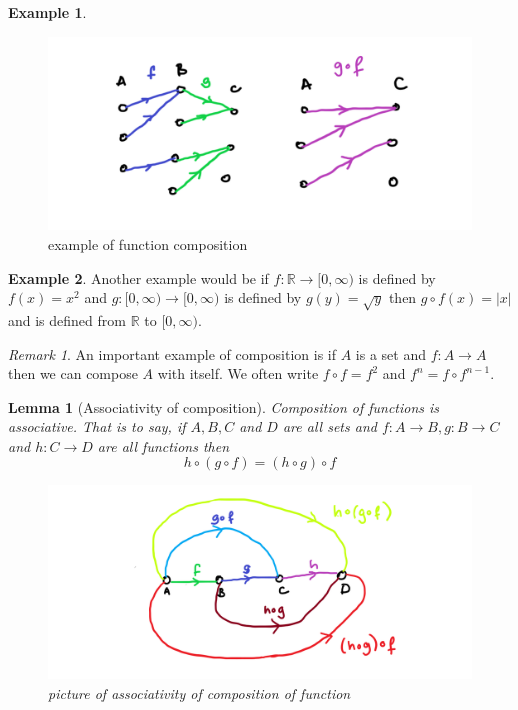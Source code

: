 \documentclass[
]{book}
\newtheorem{lemma}{Lemma}[chapter]
\theoremstyle{definition}
\theoremstyle{definition}
\newtheorem{example}{Example}[chapter]
\theoremstyle{definition}
\theoremstyle{definition}
\theoremstyle{remark}
\newtheorem*{remark}{Remark}
\begin{document}
\begin{example}

\begin{figure}
\centering
\includegraphics{compositionexample.png}
\caption{\label{fig:unnamed-chunk-18}example of function composition}
\end{figure}

\end{example}

\begin{example}
Another example would be if \(f: \mathbb{R} \rightarrow [0,\infty)\) is defined by \(f(x) = x^2\) and \(g: [0,\infty) \rightarrow [0, \infty)\) is defined by \(g(y) = \sqrt{y}\) then \(g \circ f (x) = |x|\) and is defined from \(\mathbb{R}\) to \([0,\infty)\).
\end{example}

\begin{remark}
An important example of composition is if \(A\) is a set and \(f: A \rightarrow A\) then we can compose \(A\) with itself. We often write \(f\circ f = f^2\) and \(f^n= f\circ f^{n-1}\).
\end{remark}

\begin{lemma}[Associativity of composition]

Composition of functions is associative. That is to say, if \(A,B,C\) and \(D\) are all sets and \(f:A \rightarrow B, g: B \rightarrow C\) and \(h: C \rightarrow D\) are all functions then
\[ h \circ (g \circ f) = (h \circ g) \circ f  \]

\begin{figure}
\centering
\includegraphics{compassoc.png}
\caption{\label{fig:unnamed-chunk-19}picture of associativity of composition of function}
\end{figure}

\end{lemma}
\end{document}
